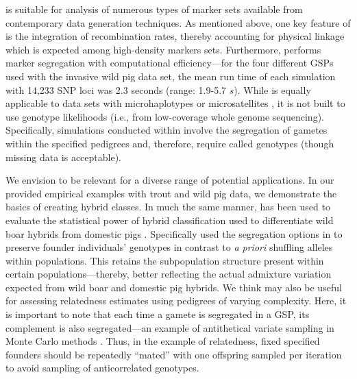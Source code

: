 {\gscramble{} is suitable for analysis of numerous types of marker sets available from contemporary data generation 
techniques. As mentioned above, 
one key feature of \gscramble{} is the integration of recombination rates, thereby accounting for physical 
linkage which is expected among high-density markers sets. Furthermore, \gscramble{} performs marker 
segregation with computational efficiency---for the four different GSPs used with the invasive wild pig data set, 
the mean run time of each simulation with 14,233 SNP loci was 2.3 seconds (range: 1.9-5.7 $s$). 
While \gscramble{} is equally applicable to data sets with 
microhaplotypes \citep{baetscher2018microhaplotypes} or microsatellites \citep{zhan2017megasat}, 
it is not built to use genotype likelihoods (i.e., from low-coverage whole genome sequencing). 
Specifically, simulations conducted within \gscramble{} involve the segregation of gametes within the 
specified pedigrees and, therefore, require called genotypes (though missing data is acceptable). 

We envision \gscramble{} to be relevant for a diverse range of potential applications. In our 
provided empirical examples with trout and wild pig data, we demonstrate the basics of 
creating hybrid classes. In much the same manner, \gscramble{} has been used to evaluate the statistical power 
of hybrid classification used to differentiate wild boar hybrids from domestic pigs 
\citep{smyser2024probgen}. Specifically \citet{smyser2024probgen} used the segregation options in \gscramble{} 
 to preserve founder individuals' genotypes in contrast to \textit{a priori} shuffling alleles 
within populations. This retains the subpopulation structure present within certain populations---thereby, better reflecting the 
actual admixture variation expected from wild boar and domestic pig hybrids. We think \gscramble{} 
may also be useful for assessing relatedness estimates using pedigrees of varying complexity. Here, it 
is important to note that each time a gamete is segregated in a GSP, its complement is also 
segregated---an example of antithetical variate sampling in Monte Carlo methods \citep{hammersley}.
Thus, in the  example of relatedness, fixed specified founders should be repeatedly ``mated'' with one offspring 
sampled per iteration to avoid sampling of anticorrelated genotypes.


}
